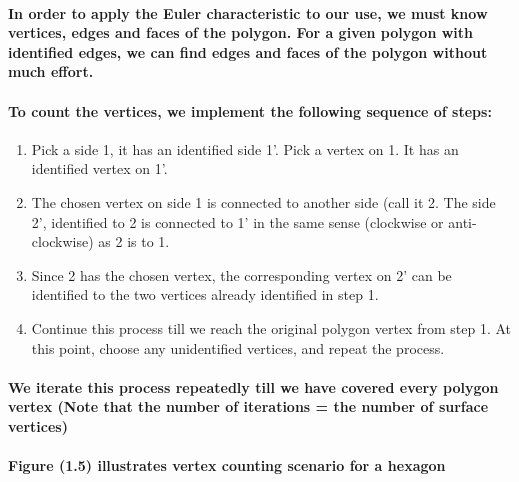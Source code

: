 \documentclass{report}
\begin{document}
\paragraph{In order to apply the Euler characteristic to our use, we must know vertices, edges and faces of the polygon. For a given polygon with identified edges, we can find edges and faces of the polygon without much effort.}

\paragraph{To count the vertices, we implement the following sequence of steps:}


\begin{enumerate}

\item Pick a side 1, it has an identified side 1’. Pick a vertex on 1. It has an identified vertex on 1’.

\item The chosen vertex on side 1 is connected to another side (call it 2. The side 2’, identified to 2 is connected to 1’ in the same sense (clockwise or anti-clockwise) as 2 is to 1.

\item Since 2 has the chosen vertex, the corresponding vertex on 2’ can be identified to the two vertices already identified in step 1.

\item Continue this process till we reach the original polygon vertex from step 1. At this point, choose any unidentified vertices, and repeat the process.

\end{enumerate}


\paragraph{We iterate this process repeatedly till we have covered every polygon vertex (Note that the number of iterations = the number of surface vertices)}

\paragraph{Figure (1.5) illustrates vertex counting scenario for a hexagon}
\end{document}

